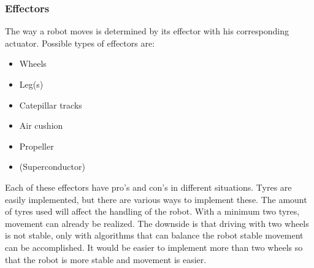 \documentclass[10pt,a4paper]{article}
\begin{document}

\subsubsection{Effectors}
The way a robot moves is determined by its effector with his corresponding actuator. Possible types of effectors are:


\begin{itemize}
\item Wheels
\item Leg(s)
\item Catepillar tracks
\item Air cushion  
\item Propeller 
\item (Superconductor)
\end{itemize}

Each of these effectors have pro's and con's in different situations. Tyres are easily implemented, but there are various ways to implement these. The amount of tyres used will affect the handling of the robot. With a minimum two tyres, movement can already be realized. The downside is that driving with two wheels is not stable, only with algorithms that can balance the robot stable movement can be accomplished. It would be easier to implement more than two wheels so that the robot is more stable and movement is easier. 
\end{document}
